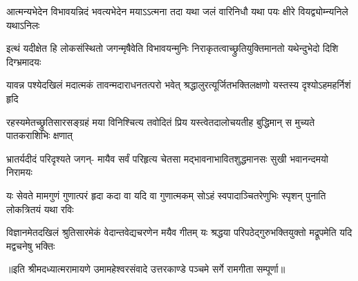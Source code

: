 \fourlineindentedshloka
{आत्मन्यभेदेन विभावयन्निदं}
{भवत्यभेदेन मयाऽऽत्मना तदा}
{यथा जलं वारिनिधौ यथा पयः}
{क्षीरे वियद्व्योम्न्यनिले यथाऽनिलः} %

\fourlineindentedshloka
{इत्थं यदीक्षेत हि लोकसंस्थितो}
{जगन्मृषैवेति विभावयन्मुनिः}
{निराकृतत्वाच्छ्रुतियुक्तिमानतो}
{यथेन्दुभेदो दिशि दिग्भ्रमादयः} %

\fourlineindentedshloka
{यावन्न पश्येदखिलं मदात्मकं}
{तावन्मदाराधनतत्परो भवेत्}
{श्रद्धालुरत्यूर्जितभक्तिलक्षणो}
{यस्तस्य दृश्योऽहमहर्निशं हृदि} %

\fourlineindentedshloka
{रहस्यमेतच्छ्रुतिसारसङ्ग्रहं}
{मया विनिश्चित्य तवोदितं प्रिय}
{यस्त्वेतदालोचयतीह बुद्धिमान्}
{स मुच्यते पातकराशिभिः क्षणात्} %

\fourlineindentedshloka
{भ्रातर्यदीदं परिदृश्यते जगन्-}
{मायैव सर्वं परिहृत्य चेतसा}
{मद्भावनाभावितशुद्धमानसः}
{सुखी भवानन्दमयो निरामयः} %

\fourlineindentedshloka
{यः सेवते मामगुणं गुणात्परं}
{हृदा कदा वा यदि वा गुणात्मकम्}
{सोऽहं स्वपादाञ्चितरेणुभिः स्पृशन्}
{पुनाति लोकत्रितयं यथा रविः} %

\fourlineindentedshloka
{विज्ञानमेतदखिलं श्रुतिसारमेकं}
{वेदान्तवेद्यचरणेन मयैव गीतम्}
{यः श्रद्धया परिपठेद्गुरुभक्तियुक्तो}
{मद्रूपमेति यदि मद्वचनेषु भक्तिः} %

{॥इति श्रीमदध्यात्मरामायणे उमामहेश्वरसंवादे उत्तरकाण्डे पञ्चमे  सर्गे
रामगीता सम्पूर्णा॥}
